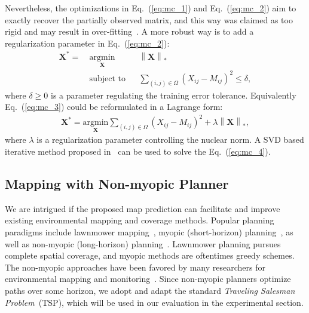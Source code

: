 Nevertheless, the optimizations in Eq.~(\ref{eq:mc_1}) and Eq.~(\ref{eq:mc_2}) aim to exactly recover the partially observed matrix, and this way was claimed as too rigid and may result in over-fitting~\cite{mazumder2010spectral}. A more robust way is to add a regularization parameter in Eq.~(\ref{eq:mc_2}):
\begin{equation}
    \label{eq:mc_3}
    \begin{aligned}
        \mathbf{X}^* = ~&\underset{\mathbf{X}}{\text{argmin}} 
               &&\left \| \mathbf{X} \right \|_*\\
               &\text{subject to}
               && \sum_{(i, j)\in \Omega}(X_{ij} - M_{ij})^2\leq \delta,
    \end{aligned}
\end{equation}
where $\delta \geq 0$ is a parameter regulating the training error tolerance. Equivalently Eq.~(\ref{eq:mc_3}) could be reformulated in a Lagrange form:
\begin{equation}
    \label{eq:mc_4}
    \begin{aligned}
        \mathbf{X}^* = \underset{\mathbf{X}}{\text{argmin}} \sum_{(i, j)\in \Omega} (X_{ij} - M_{ij})^2 + \lambda \left \|\mathbf{X} \right \|_{*},
    \end{aligned}
\end{equation}
where $\lambda$ is a regularization parameter controlling the nuclear norm. A SVD based iterative method proposed in~\cite{mazumder2010spectral} can be used to solve the Eq.~(\ref{eq:mc_4}).


\subsection{Mapping with Non-myopic Planner}
\label{sect:plan}

We are intrigued if the proposed map prediction can facilitate and improve existing environmental mapping and coverage methods. Popular planning paradigms include lawnmower mapping~\cite{li2019coverage, song2018varepsilon}, myopic (short-horizon) planning~\cite{khan2014greedy}, as well as non-myopic (long-horizon) planning~\cite{ kantaros2019asymptotically}. Lawnmower planning pursues complete spatial coverage, and myopic methods are oftentimes greedy schemes. The non-myopic approaches have been favored by many researchers for environmental mapping and monitoring~\cite{ma2016information, chen2019pareto}. Since non-myopic planners optimize paths over some horizon, we adopt and adapt the standard  \textit{Traveling Salesman Problem}~(TSP), which will be used in our evaluation in the experimental section. 

